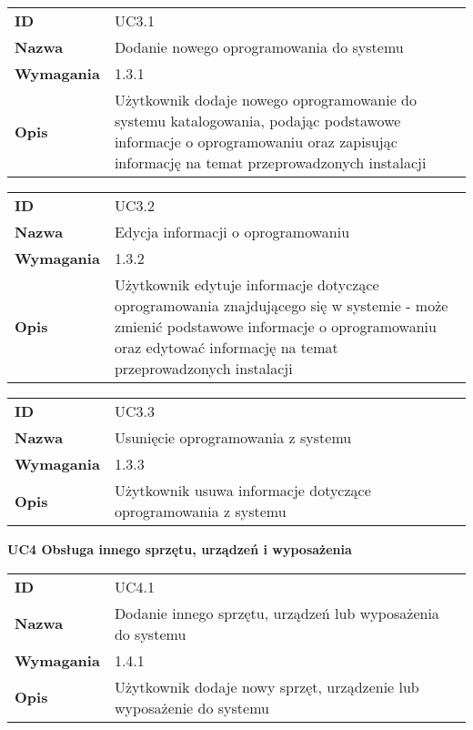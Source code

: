 \begin{tabular}{p{}p{}}
\hfill {\bf ID} & UC3.1 \\
\hfill {\bf Nazwa} & Dodanie nowego oprogramowania do systemu \\
\hfill {\bf Wymagania} & 1.3.1 \\
\hfill {\bf Opis} & Użytkownik dodaje nowego oprogramowanie do systemu katalogowania, podając podstawowe informacje o oprogramowaniu oraz zapisując informację na temat przeprowadzonych instalacji \\
\end{tabular}

\vspace{.05\textheight}

\begin{tabular}{p{}p{}}
\hfill {\bf ID} & UC3.2 \\
\hfill {\bf Nazwa} &  Edycja informacji o oprogramowaniu \\
\hfill {\bf Wymagania} & 1.3.2 \\
\hfill {\bf Opis} & Użytkownik edytuje informacje dotyczące oprogramowania znajdującego się w systemie - może zmienić podstawowe informacje o oprogramowaniu oraz edytować informację na temat przeprowadzonych instalacji \\
\end{tabular}

\vspace{.05\textheight}

\begin{tabular}{p{}p{}}
\hfill {\bf ID} & UC3.3 \\
\hfill {\bf Nazwa} & Usunięcie oprogramowania z systemu \\
\hfill {\bf Wymagania} & 1.3.3 \\
\hfill {\bf Opis} & Użytkownik usuwa informacje dotyczące oprogramowania z systemu \\
\end{tabular}

\vspace{.03\textheight}
\begin{center}
  {\Large\bf UC4 Obsługa innego sprzętu, urządzeń i wyposażenia } \\
\end{center}
\vspace{.02\textheight}

\begin{tabular}{p{}p{}}
\hfill {\bf ID} & UC4.1  \\
\hfill {\bf Nazwa} & Dodanie innego sprzętu, urządzeń lub wyposażenia do systemu \\
\hfill {\bf Wymagania} & 1.4.1 \\
\hfill {\bf Opis} &  Użytkownik dodaje nowy sprzęt, urządzenie lub wyposażenie do systemu \\
\end{tabular}

